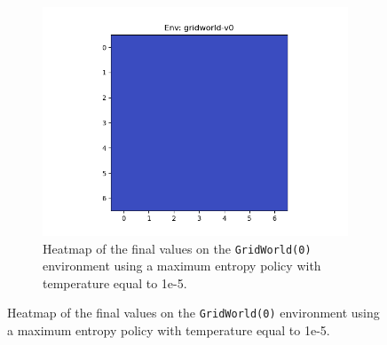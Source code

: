 \documentclass{article}
\begin{document}
\begin{enumerate}[(a)]
\begin{figure}[h!]
\begin{subfigure}{0.3\textwidth}
    \end{subfigure}
    \hspace{0.1 in}
     \begin{subfigure}{0.3\textwidth}
        \centering
        \includegraphics[width=\textwidth]{../figures/gridworld-v0_maxent_t2.png}
        \caption{Heatmap of the final values on the \texttt{GridWorld(0)} environment using a maximum entropy policy with temperature equal to 1e-5.}
    \end{subfigure}
\end{figure}
\vspace{-0.1 in}


\end{enumerate}
\end{document}
